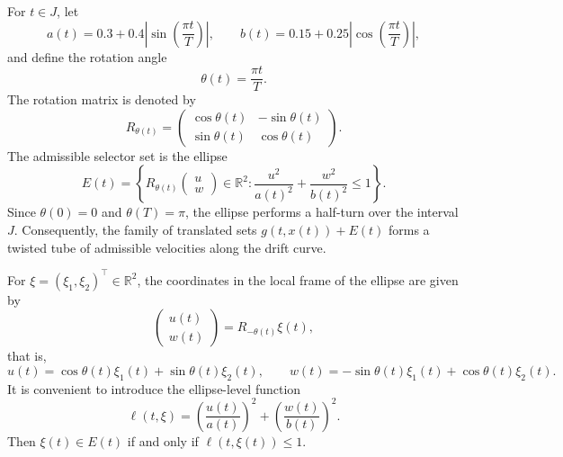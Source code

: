 \documentclass[11pt]{article}
\theoremstyle{definition}
\theoremstyle{remark}
\newcommand{\R}{\mathbb{R}}
\begin{document}
For $t\in J$, let
\begin{equation}
    a(t)=0.3+0.4\left|\sin\left(\frac{\pi t}{T}\right)\right|,
    \qquad
    b(t)=0.15+0.25\left|\cos\left(\frac{\pi t}{T}\right)\right|,
    \label{eq:axes}
\end{equation}
and define the rotation angle
\begin{equation}
    \theta(t)=\frac{\pi t}{T}.
    \label{eq:angle}
\end{equation}
The rotation matrix is denoted by
\begin{equation}
    R_{\theta(t)}=
    \begin{pmatrix}
    \cos\theta(t)&-\sin\theta(t)\\
    \sin\theta(t)& \cos\theta(t)
    \end{pmatrix}.
    \label{eq:rotation}
\end{equation}
The admissible selector set is the ellipse
\begin{equation}
    E(t)=\left\{R_{\theta(t)}
    \begin{pmatrix}u\\w\end{pmatrix}\in\R^2:
    \frac{u^2}{a(t)^2}+\frac{w^2}{b(t)^2}\leq 1\right\}.
    \label{eq:ellipse}
\end{equation}
Since $\theta(0)=0$ and $\theta(T)=\pi$, the ellipse performs a half-turn over the interval $J$. Consequently, the family of translated sets $g(t,x(t))+E(t)$ forms a twisted tube of admissible velocities along the drift curve.

For $\xi=(\xi_1,\xi_2)^{\top}\in\R^2$, the coordinates in the local frame of the ellipse are given by
\begin{equation}
    \begin{pmatrix}u(t)\\w(t)\end{pmatrix}=R_{-\theta(t)}\xi(t),
    \label{eq:local-coordinates}
\end{equation}
that is,
\begin{equation}
    u(t)=\cos\theta(t)\xi_1(t)+\sin\theta(t)\xi_2(t),
    \qquad
    w(t)=-\sin\theta(t)\xi_1(t)+\cos\theta(t)\xi_2(t).
    \label{eq:uw-coordinates}
\end{equation}
It is convenient to introduce the ellipse-level function
\begin{equation}
    \ell(t,\xi)=
    \left(\frac{u(t)}{a(t)}\right)^2+
    \left(\frac{w(t)}{b(t)}\right)^2.
    \label{eq:level-function}
\end{equation}
Then $\xi(t)\in E(t)$ if and only if $\ell(t,\xi(t))\leq 1$.
\end{document}
